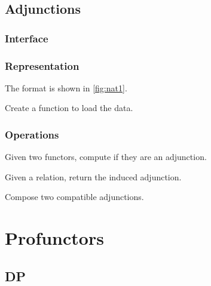 \section{Adjunctions}

\subsection*{Interface}

\subsection*{Representation}

The format is shown in \cref{fig:nat1}.



\begin{exercise}
  Create a function to load the data.

%
\end{exercise}

\subsection{Operations}
\begin{exercise}
  Given two functors, compute if they are an adjunction.

\end{exercise}

\begin{exercise}
  Given a relation, return the induced adjunction.
\end{exercise}


\begin{exercise}
  Compose two compatible adjunctions.
\end{exercise}


\chapter{Profunctors}


\section{DP}

